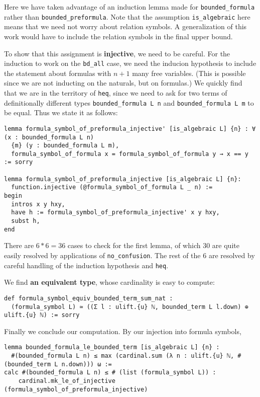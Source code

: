 Here we have taken advantage of an induction lemma made for \texttt{bounded\_{formula}}
rather than \texttt{bounded\_{preformula}}.
Note that the assumption \texttt{is\_{algebraic}} here means that we need not
worry about relation symbols.
A generalization of this work would have to include the relation symbols
in the final upper bound.

To show that this assignment is \textbf{injective},
we need to be careful.
For the induction to work on the \texttt{bd\_all} case,
we need the inducion hypothesis to include the statement about formulas
with $n+1$ many free variables.
(This is possible since we are not inducting on the naturals, but on formulas.)
We quickly find that we are in the territory of \texttt{heq},
since we need to ask for two terms of definitionally different types
\texttt{bounded\_formula L n} and \texttt{bounded\_formula L m} to be equal.
Thus we state it as follows:

\begin{lstlisting}
lemma formula_symbol_of_preformula_injective' [is_algebraic L] {n} : ∀ (x : bounded_formula L n)
  {m} (y : bounded_formula L m),
  formula_symbol_of_formula x = formula_symbol_of_formula y → x == y := sorry

lemma formula_symbol_of_preformula_injective [is_algebraic L] {n}:
  function.injective (@formula_symbol_of_formula L _ n) :=
begin
  intros x y hxy,
  have h := formula_symbol_of_preformula_injective' x y hxy,
  subst h,
end \end{lstlisting}

There are $6 * 6 = 36$ cases to check for the first lemma,
of which $30$ are quite easily resolved by applications of
\texttt{no\_confusion}.
The rest of the $6$ are resolved by careful handling of the induction
hypothesis and \texttt{heq}.

We find \textbf{an equivalent type}, whose cardinality is easy to compute:

\begin{lstlisting}
def formula_symbol_equiv_bounded_term_sum_nat :
  (formula_symbol L) ≃ ((Σ l : ulift.{u} ℕ, bounded_term L l.down) ⊕ ulift.{u} ℕ) := sorry \end{lstlisting}

Finally we conclude our computation.
By our injection into formula symbols,

\begin{lstlisting}
lemma bounded_formula_le_bounded_term [is_algebraic L] {n} :
  #(bounded_formula L n) ≤ max (cardinal.sum (λ n : ulift.{u} ℕ, #(bounded_term L n.down))) ω :=
calc #(bounded_formula L n) ≤ # (list (formula_symbol L)) :
    cardinal.mk_le_of_injective (formula_symbol_of_preformula_injective) \end{lstlisting}

